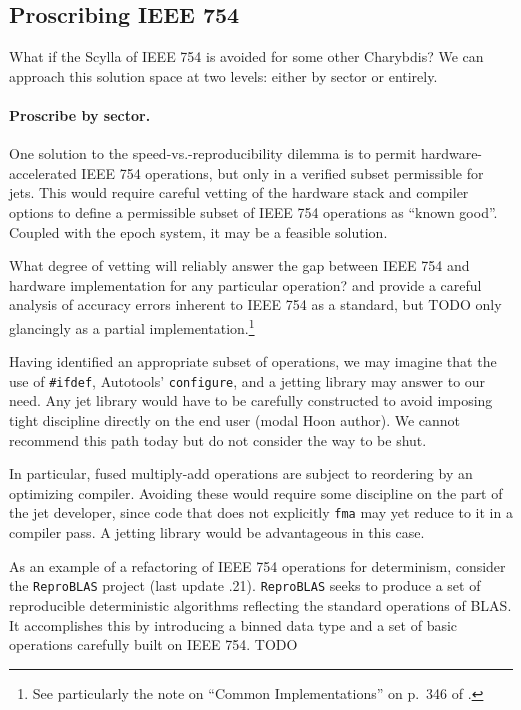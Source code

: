 \documentclass[twoside]{article}
\begin{document}
\subsection{Proscribing IEEE 754}

What if the Scylla of IEEE 754 is avoided for some other Charybdis?  We can approach this solution space at two levels:  either by sector or entirely.

\paragraph{Proscribe by sector.}

One solution to the speed-vs.-reproducibility dilemma is to permit hardware-accelerated IEEE 754 operations, but only in a verified subset permissible for jets.  This would require careful vetting of the hardware stack and compiler options to define a permissible subset of IEEE 754 operations as “known good”.  Coupled with the epoch system, it may be a feasible solution.

What degree of vetting will reliably answer the gap between IEEE 754 and hardware implementation for any particular operation?  \citet[pp.~330ff.]{Jones2008} and \citet{Goldberg2000} provide a careful analysis of accuracy errors inherent to IEEE 754 as a standard, but 
TODO only glancingly as a partial implementation.\footnote{See particularly the note on “Common Implementations” on p.~346 of \citet{Jones2008}.}

Having identified an appropriate subset of operations, we may imagine that the use of \texttt{#ifdef}, Autotools’ \texttt{configure}, and a jetting library may answer to our need.  Any jet library would have to be carefully constructed to avoid imposing tight discipline directly on the end user (modal Hoon author).  We cannot recommend this path today but do not consider the way to be shut.

In particular, fused multiply-add operations are subject to reordering by an optimizing compiler.  Avoiding these would require some discipline on the part of the jet developer, since code that does not explicitly \texttt{fma} may yet reduce to it in a compiler pass.  A jetting library would be advantageous in this case.

As an example of a refactoring of IEEE 754 operations for determinism, consider the \texttt{ReproBLAS} project (last update .21).   \texttt{ReproBLAS} seeks to produce a set of reproducible deterministic algorithms reflecting the standard operations of BLAS.  It accomplishes this by introducing a binned data type and a set of basic operations carefully built on IEEE 754.
TODO
\end{document}
